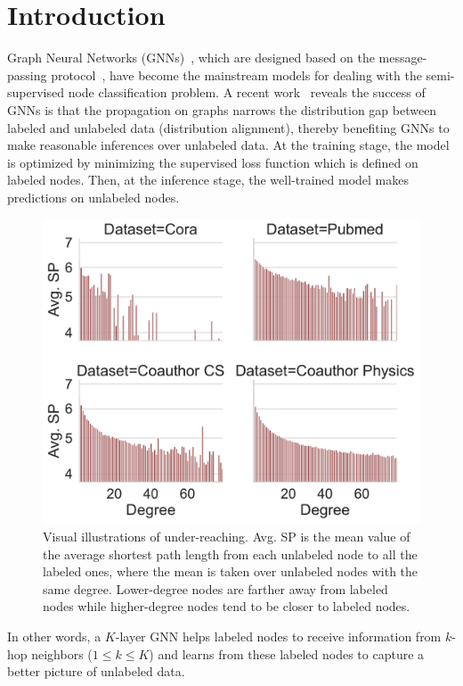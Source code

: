 \documentclass[letterpaper]{article} %
\begin{document}
\section{Introduction}
Graph Neural Networks (GNNs)~\cite{gcn, gat, sgc, gcnii, appnp, sage}, which are designed based on the message-passing protocol~\cite{mpnn}, have become the mainstream models for dealing with the semi-supervised node classification problem. A recent work~\cite{distribution} reveals the success of GNNs is that the propagation on graphs narrows the distribution gap between labeled and unlabeled data (distribution alignment), thereby benefiting GNNs to make reasonable inferences over unlabeled data. At the training stage, the model is optimized by minimizing the supervised loss function which is defined on labeled nodes. Then, at the inference stage, the well-trained model makes predictions on unlabeled nodes. 
\begin{figure}[!htbp]
        \centering
       \includegraphics[width=0.85\columnwidth]{figs/Avg_SP_Distribution.pdf}
        \caption{Visual illustrations of under-reaching. Avg. SP is the mean value of the average shortest path length from each unlabeled node to all the labeled ones, where the mean is taken over unlabeled nodes with the same degree. Lower-degree nodes are farther away from labeled nodes while higher-degree nodes tend to be closer to labeled nodes.}
        \label{fig:under-reaching}
\end{figure}
In other words, a $K$-layer GNN helps labeled nodes to receive information from $k$-hop neighbors ($1 \leq k \leq K$) and learns from these labeled nodes to capture a better picture of unlabeled data.
\end{document}
